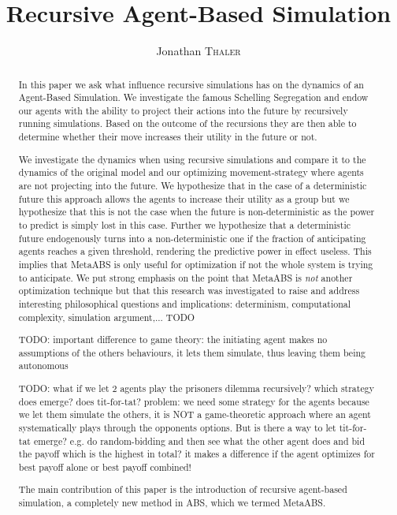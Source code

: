 \documentclass[a4paper, 10pt, conference]{IEEEtran}
\title{Recursive Agent-Based Simulation} %
\author{Jonathan \textsc{Thaler}} %
\begin{document}
\maketitle %

\begin{abstract}
In this paper we ask what influence recursive simulations has on the dynamics of an Agent-Based Simulation. We investigate the famous Schelling Segregation and endow our agents with the ability to project their actions into the future by recursively running simulations. Based on the outcome of the recursions they are then able to determine whether their move increases their utility in the future or not.

We investigate the dynamics when using recursive simulations and compare it to the dynamics of the original model and our optimizing movement-strategy where agents are not projecting into the future. We hypothesize that in the case of a deterministic future this approach allows the agents to increase their utility as a group but we hypothesize that this is not the case when the future is non-deterministic as the power to predict is simply lost in this case.  Further we hypothesize that a deterministic future endogenously turns into a non-deterministic one if the fraction of anticipating agents reaches a given threshold, rendering the predictive power in effect useless. This implies that MetaABS is only useful for optimization if not the whole system is trying to anticipate. 
We put strong emphasis on the point that MetaABS is \textit{not} another optimization technique but that this research was investigated to raise and address interesting philosophical questions and implications: determinism, computational complexity, simulation argument,... TODO

TODO: important difference to game theory: the initiating agent makes no assumptions of the others behaviours, it lets them simulate, thus leaving them being autonomous

TODO:  what if we let 2 agents play the prisoners dilemma recursively? which strategy does emerge? does tit-for-tat? problem: we need some strategy for the agents because we let them simulate the others, it is NOT a game-theoretic approach where an agent systematically plays through the opponents options. But is there a way to let tit-for-tat emerge? e.g. do random-bidding and then see what the other agent does and bid the payoff which is the highest in total? it makes a difference if the agent optimizes for best payoff alone or best payoff combined!

The main contribution of this paper is the introduction of recursive agent-based simulation, a completely new method in ABS, which we termed MetaABS.
\end{abstract}













\end{document}
